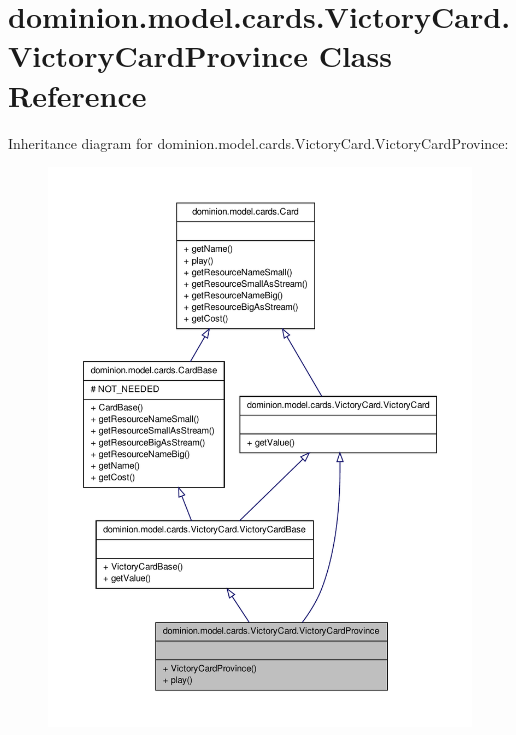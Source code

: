 \hypertarget{classdominion_1_1model_1_1cards_1_1VictoryCard_1_1VictoryCardProvince}{\section{dominion.\-model.\-cards.\-Victory\-Card.\-Victory\-Card\-Province \-Class \-Reference}
\label{classdominion_1_1model_1_1cards_1_1VictoryCard_1_1VictoryCardProvince}
}


\-Inheritance diagram for dominion.\-model.\-cards.\-Victory\-Card.\-Victory\-Card\-Province\-:
\nopagebreak
\begin{figure}[H]
\begin{center}
\leavevmode
\includegraphics[width=350pt]{classdominion_1_1model_1_1cards_1_1VictoryCard_1_1VictoryCardProvince__inherit__graph}
\end{center}
\end{figure}


